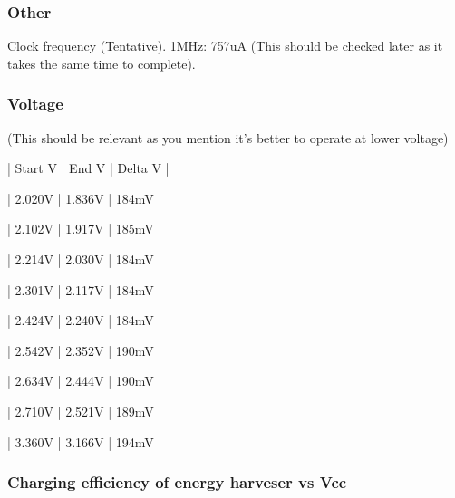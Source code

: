 \subsubsection{Other}
Clock frequency (Tentative). 1MHz: 757uA (This should be checked later as it takes the same time to complete).


\subsubsection{Voltage}

(This should be relevant as you mention it's better to operate at lower voltage)











| Start V | End V | Delta V |

| 2.020V        | 1.836V      | 184mV   |

| 2.102V        | 1.917V      | 185mV   |

| 2.214V        | 2.030V      | 184mV   |

| 2.301V        | 2.117V      | 184mV   |

| 2.424V        | 2.240V      | 184mV   |

| 2.542V        | 2.352V      | 190mV   |

| 2.634V        | 2.444V      | 190mV   |

| 2.710V        | 2.521V      | 189mV   |

| 3.360V        | 3.166V      | 194mV   |


\subsubsection{Charging efficiency of energy harveser vs Vcc}


